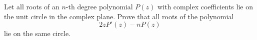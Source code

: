 Let all roots of an $n$-th degree polynomial $P(z)$ with complex coefficients lie on the unit circle in the complex plane. Prove that all roots of the polynomial
$$2zP'(z)-nP(z)$$lie on the same circle.